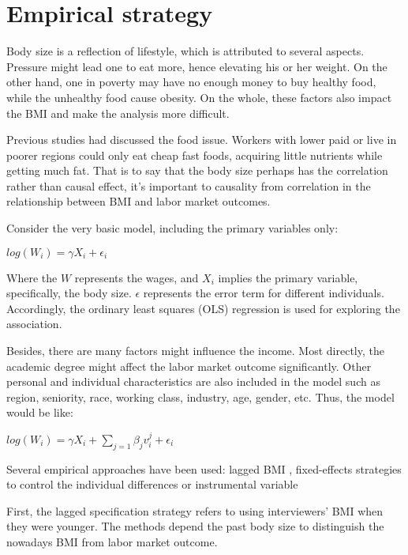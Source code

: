 \documentclass{article}
\begin{document}
\section{Empirical strategy}
Body size is a reflection of lifestyle, which is attributed to several aspects. Pressure might lead one to eat more, hence elevating his or her weight. On the other hand, one in poverty may have no enough money to buy healthy food, while the unhealthy food cause obesity. On the whole, these factors also impact the BMI and make the analysis more difficult.
\par
\setlength{\parindent}{2em}
Previous studies had discussed the food issue. Workers with lower paid or live in poorer regions could only eat cheap fast foods, acquiring little nutrients while getting much fat. That is to say that the body size perhaps has the correlation rather than causal effect, it’s important to causality from correlation in the relationship between BMI and labor market outcomes.
\par
\setlength{\parindent}{2em}
Consider the very basic model, including the primary variables only: 
\begin{center}
$log(W_i) = \gamma X_i + \epsilon_i $
\end{center}
Where the $W$ represents the wages, and $X_i$ implies the primary variable, specifically, the body size. $\epsilon$ represents the error term for different individuals. Accordingly, the ordinary least
squares (OLS) regression is used for exploring the association.
\par
\setlength{\parindent}{2em}
Besides, there are many factors might influence the income. Most directly, the academic degree might affect the labor market outcome significantly. Other personal and individual characteristics are also included in the model such as region, seniority, race, working class, industry, age, gender, etc. Thus, the model would be like:
\begin{center}
$log(W_i) = \gamma X_i + \sum_{j=1} \beta_j v_i^j + \epsilon_i $
\end{center}
\par
\setlength{\parindent}{2em}
Several empirical approaches have been used: lagged BMI \citep{conley2005gender,norton2008genetic}, fixed-effects strategies to control the individual differences \citep{cawley2004impact,norton2011identity} or instrumental variable \citep{cawley2004impact,brunello2007does,frayling2007common,greve2008obesity}
\par
\setlength{\parindent}{2em}
First, the lagged specification strategy refers to using interviewers’ BMI when they were younger. The methods depend the past body size to distinguish the nowadays BMI from labor market outcome.
\end{document}
